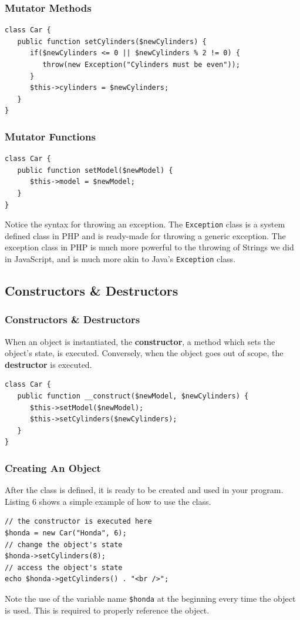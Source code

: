 \documentclass[aspectratio=169]{beamer}
\begin{document}
\begin{frame}[fragile]
\frametitle{Mutator Methods}
\begin{lstlisting}[caption=The Car's Mutator Methods]
class Car {
   public function setCylinders($newCylinders) {
      if($newCylinders <= 0 || $newCylinders % 2 != 0) {
         throw(new Exception("Cylinders must be even"));
      }
      $this->cylinders = $newCylinders;
   }
}
\end{lstlisting}
\end{frame}

\begin{frame}[fragile]
\frametitle{Mutator Functions}
\begin{lstlisting}[caption=The Car's Mutator Methods (cont)]
class Car {
   public function setModel($newModel) {
      $this->model = $newModel;
   }
}
\end{lstlisting}

Notice the syntax for throwing an exception. The \texttt{Exception} class is a system defined class in PHP and is ready-made for throwing a generic exception. The exception class in PHP is much more powerful to the throwing of Strings we did in JavaScript, and is much more akin to Java's \texttt{Exception} class.
\end{frame}

\subsection{Constructors \& Destructors}
\begin{frame}[fragile]
\frametitle{Constructors \& Destructors}
When an object is instantiated, the \textbf{constructor}, a method which sets the object's state, is executed. Conversely, when the object goes out of scope, the \textbf{destructor} is executed.
\begin{lstlisting}[caption=The Car's Constructor]
class Car {
   public function __construct($newModel, $newCylinders) {
      $this->setModel($newModel);
      $this->setCylinders($newCylinders);
   }
}
\end{lstlisting}
\end{frame}

\begin{frame}[fragile]
\frametitle{Creating An Object}
After the class is defined, it is ready to be created and used in your program. Listing 6 shows a simple example of how to use the class.
\begin{lstlisting}[caption=Creating a Car Object]
// the constructor is executed here
$honda = new Car("Honda", 6);
// change the object's state
$honda->setCylinders(8);
// access the object's state
echo $honda->getCylinders() . "<br />";
\end{lstlisting}
Note the use of the variable name \texttt{\$honda} at the beginning every time the object is used. This is required to properly reference the object.
\end{frame}
\end{document}
